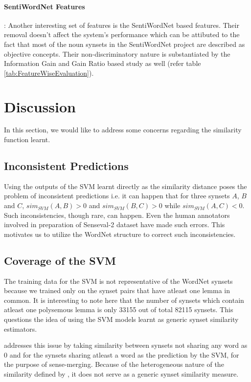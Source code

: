 \paragraph{SentiWordNet Features}: 
Another interesting set of features is the SentiWordNet based features. Their removal doesn't affect the system's performance which can be attibuted to the fact that most of the noun synsets in the SentiWordNet project are described as objective concepts. Their non-discriminatory nature is substantiated by the Information Gain and Gain Ratio based study as well (refer table \ref{tab:FeatureWiseEvaluation}). 

\section{Discussion}
In this section, we would like to address some concerns regarding the similarity function learnt.

\subsection{Inconsistent Predictions} 
\label{section:SVMInconsistentPredictions}
Using the outputs of the SVM learnt directly as the similarity distance poses the problem of inconsistent predictions i.e. it can happen that for three synsets $A$, $B$ and $C$, $sim_{SVM}(A,B) > 0$ and $sim_{SVM}(B,C) > 0$ while $sim_{SVM}(A,C) < 0$. Such inconsistencies, though rare, can happen. Even the human annotators involved in preparation of Senseval-2 dataset \citep{Senseval2LexicalSampleTask} have made such errors. This motivates us to utilize the WordNet structure to correct such inconsistencies. %

\subsection{Coverage of the SVM} 
The training data for the SVM is not representative of the WordNet synsets because we trained only on the synset pairs that have atleast one lemma in common. It is interesting to note here that the number of synsets which contain atleast one polysemous lemma is only 33155 out of total 82115 synsets. This questions the idea of using the SVM models learnt as generic synset similarity estimators. 

\citep{snow07mergesense} addresses this issue by taking similarity between synsets not sharing any word as $0$ and for the synsets sharing atleast a word as the prediction by the SVM, for the purpose of sense-merging. Because of the heterogeneous nature of the similarity defined by \citep{snow07mergesense}, it does not serve as a generic synset similarity measure.

